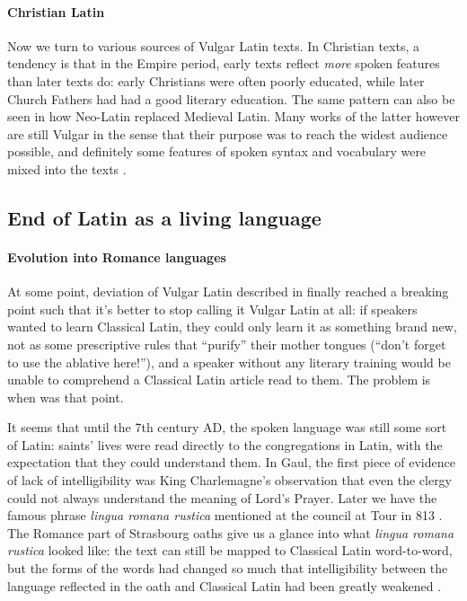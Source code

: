 \documentclass[a4paper, oneside, 12pt]{report}
\newcommand*{\citepage}[1]{p.~{#1}}
\newcommand*{\citepages}[1]{pp.~{#1}}
\newcommand{\form}[1]{\emph{#1}}
\begin{document}
\paragraph*{Christian Latin}
Now we turn to various sources of Vulgar Latin texts.
In Christian texts, a tendency is that in the Empire period,
early texts reflect \emph{more} spoken features than later texts do:
early Christians were often poorly educated,
while later Church Fathers had had a good literary education.
The same pattern can also be seen in how Neo-Latin replaced Medieval Latin.
Many works of the latter however are still Vulgar
in the sense that their purpose was to reach the widest audience possible,
and definitely some features of spoken syntax and vocabulary were mixed into the texts
\citep[\citepage{24}]{herman2010vulgar}.

\subsection{End of Latin as a living language}

\paragraph*{Evolution into Romance languages}
At some point, deviation of Vulgar Latin described in  
finally reached a breaking point
such that it's better to stop calling it Vulgar Latin at all:
if speakers wanted to learn Classical Latin,
they could only learn it as something brand new,
not as some prescriptive rules that ``purify'' their mother tongues 
(``don't forget to use the ablative here!''),
and a speaker without any literary training would be unable to comprehend 
a Classical Latin article read to them.
The problem is when was that point.

It seems that until the 7th century AD, the spoken language was still some sort of Latin:
saints' lives were read directly to the congregations in Latin,
with the expectation that they could understand them.
In Gaul, the first piece of evidence of lack of intelligibility
was King Charlemagne's observation that even the clergy 
could not always understand the meaning of Lord's Prayer.
Later we have the famous phrase \form{lingua romana rustica}
mentioned at the council at Tour in 813
\citep[\citepage{114}]{herman2010vulgar}.
The Romance part of Strasbourg oaths give us a glance into what \form{lingua romana rustica} looked like:
the text can still be mapped to Classical Latin word-to-word,
but the forms of the words had changed so much
that intelligibility between the language reflected in the oath and Classical Latin
had been greatly weakened \citep[\citepages{300-301}]{clackson2011blackwell}.
\end{document}
